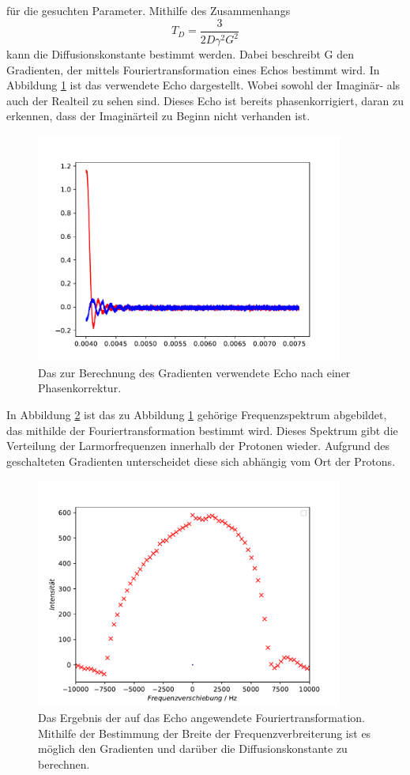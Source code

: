 für die gesuchten Parameter.
Mithilfe des Zusammenhangs
\begin{equation}
  T_D = \frac{3}{2D\gamma^2 G^2}
\label{eqn:D}
\end{equation}
kann die Diffusionskonstante bestimmt werden. Dabei beschreibt G den Gradienten, der mittels Fouriertransformation eines Echos
bestimmt wird. In Abbildung \ref{fig:echo} ist das verwendete Echo dargestellt. Wobei sowohl der Imaginär- als auch der Realteil
zu sehen sind. Dieses Echo ist bereits phasenkorrigiert, daran zu erkennen, dass der Imaginärteil zu Beginn nicht verhanden ist.
\begin{figure}[H]
  \centering
  \includegraphics[width=0.9\textwidth]{../Auswertung/echo.pdf}
  \caption{Das zur Berechnung des Gradienten verwendete Echo nach einer Phasenkorrektur.}
  \label{fig:echo}
\end{figure} \noindent
In Abbildung \ref{fig:ft} ist das zu Abbildung \ref{fig:echo} gehörige Frequenzspektrum abgebildet, das mithilde der 
Fouriertransformation bestimmt wird. Dieses Spektrum gibt die Verteilung der Larmorfrequenzen innerhalb der Protonen wieder.
Aufgrund des geschalteten Gradienten unterscheidet diese sich abhängig vom Ort der Protons.
\begin{figure}[H]
  \centering
  \includegraphics[width=0.9\textwidth]{../Auswertung/echo_ft.pdf}
  \caption{Das Ergebnis der auf das Echo angewendete Fouriertransformation. Mithilfe der Bestimmung der Breite der Frequenzverbreiterung
  ist es möglich den Gradienten und darüber die Diffusionskonstante zu berechnen.}
  \label{fig:ft}
\end{figure} \noindent
